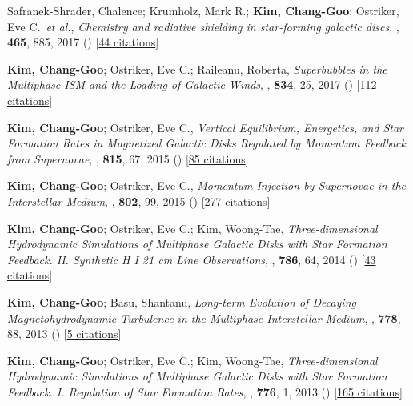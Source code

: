 \item[{11.}]Safranek-Shrader, Chalence; Krumholz, Mark R.; \textbf{Kim, Chang-Goo}; Ostriker, Eve C.~\textit{et al.}, \textit{Chemistry and radiative shielding in star-forming galactic discs}, , \textbf{465}, 885, 2017 () [\href{http://adsabs.harvard.edu/abs/2017MNRAS.465..885S}{44 citations}]

\item[{10.}]\textbf{Kim, Chang-Goo}; Ostriker, Eve C.; Raileanu, Roberta, \textit{Superbubbles in the Multiphase ISM and the Loading of Galactic Winds}, , \textbf{834}, 25, 2017 () [\href{http://adsabs.harvard.edu/abs/2017ApJ...834...25K}{112 citations}]

\item[{9.}]\textbf{Kim, Chang-Goo}; Ostriker, Eve C., \textit{Vertical Equilibrium, Energetics, and Star Formation Rates in Magnetized Galactic Disks Regulated by Momentum Feedback from Supernovae}, , \textbf{815}, 67, 2015 () [\href{http://adsabs.harvard.edu/abs/2015ApJ...815...67K}{85 citations}]

\item[{8.}]\textbf{Kim, Chang-Goo}; Ostriker, Eve C., \textit{Momentum Injection by Supernovae in the Interstellar Medium}, , \textbf{802}, 99, 2015 () [\href{http://adsabs.harvard.edu/abs/2015ApJ...802...99K}{277 citations}]

\item[{7.}]\textbf{Kim, Chang-Goo}; Ostriker, Eve C.; Kim, Woong-Tae, \textit{Three-dimensional Hydrodynamic Simulations of Multiphase Galactic Disks with Star Formation Feedback. II. Synthetic H I 21 cm Line Observations}, , \textbf{786}, 64, 2014 () [\href{http://adsabs.harvard.edu/abs/2014ApJ...786...64K}{43 citations}]

\item[{6.}]\textbf{Kim, Chang-Goo}; Basu, Shantanu, \textit{Long-term Evolution of Decaying Magnetohydrodynamic Turbulence in the Multiphase Interstellar Medium}, , \textbf{778}, 88, 2013 () [\href{http://adsabs.harvard.edu/abs/2013ApJ...778...88K}{5 citations}]

\item[{5.}]\textbf{Kim, Chang-Goo}; Ostriker, Eve C.; Kim, Woong-Tae, \textit{Three-dimensional Hydrodynamic Simulations of Multiphase Galactic Disks with Star Formation Feedback. I. Regulation of Star Formation Rates}, , \textbf{776}, 1, 2013 () [\href{http://adsabs.harvard.edu/abs/2013ApJ...776....1K}{165 citations}]

